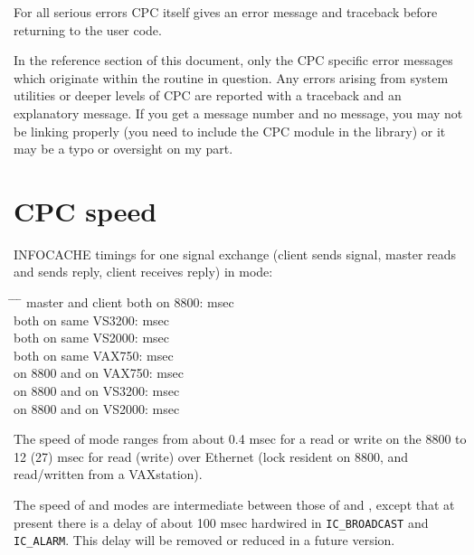 For all serious errors CPC itself gives an error message and traceback
before returning to the user code.

In the reference section of this document, only the CPC specific error
messages which originate within the routine in question. Any errors arising
from system utilities or deeper levels of CPC are reported with a traceback
and an explanatory message. If you get a message number and no message,
you may not be linking properly (you need to include the CPC module in the
library) or it may be a typo or oversight on my part.

\newpage
\part{CPC speed}
INFOCACHE timings for one signal exchange (client sends signal, master reads
and sends reply, client receives reply) in \mailbox mode:

\begin{tabbing}
\hspace*{3.5cm} \= \hspace*{7.0cm} \= \hspace*{2.5cm} \= \kill 
master and client \> both on 8800:                  msec \\
\>                   both on same VS3200:           msec  \\
\>                   both on same VS2000:           msec  \\
\>                   both on same VAX750:           msec  \\
\>                   on 8800 and on VAX750:         msec  \\
\>                   on 8800 and on VS3200:         msec  \\
\>                   on 8800 and on VS2000:         msec  \\
\end{tabbing}

The speed of \info mode ranges from about 0.4 msec for a read or
write on the 8800 to 12 (27) msec for read (write) over Ethernet (lock
resident on 8800, and read/written from a VAXstation).

The speed of \broadcast and \alarm modes are intermediate between
those of \mailbox and \info, except that at present there is
a delay of about 100 msec hardwired in {\tt IC\_BROADCAST} and
{\tt IC\_ALARM}. This delay will be removed or reduced in a future
version. %

